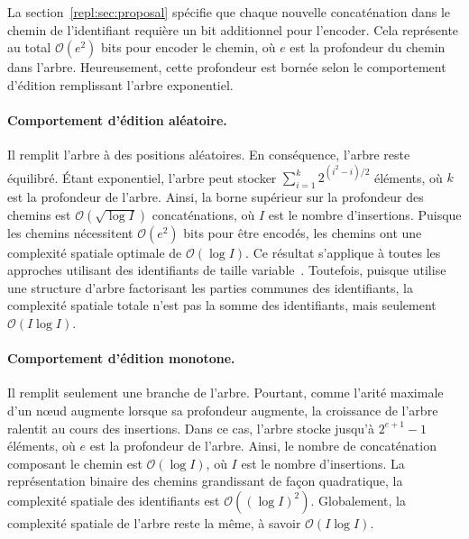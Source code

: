 La section~\ref{repl:sec:proposal} spécifie que chaque nouvelle concaténation
dans le chemin de l'identifiant requière un bit additionnel pour l'encoder. Cela
représente au total $\mathcal{O}(e^2)$ bits pour encoder le chemin, où $e$ est
la profondeur du chemin dans l'arbre. Heureusement, cette profondeur est bornée
selon le comportement d'édition remplissant l'arbre exponentiel. 


\begin{figure}
  \begin{center}
    \hspace{10pt}
    \hspace{10pt}
  \end{center}
\end{figure}


\paragraph{Comportement d'édition aléatoire. } Il remplit l'arbre à des positions
aléatoires. En conséquence, l'arbre reste équilibré. Étant exponentiel, l'arbre
peut stocker $\textstyle\sum\nolimits_{i=1}^{k}{2^{(i^2-i)/2}}$ éléments, où $k$
est la profondeur de l'arbre. Ainsi, la borne supérieur sur la profondeur des
chemins est $\mathcal{O}(\sqrt{\log I})$ concaténations, où $I$ est le nombre
d'insertions. Puisque les chemins nécessitent $\mathcal{O}(e^2)$ bits pour être
encodés, les chemins ont une complexité spatiale optimale de
$\mathcal{O}(\log I)$. Ce résultat s'applique à toutes les approches utilisant
des identifiants de taille variable~\cite{preguica2009commutative,
  weiss2009logoot}. Toutefois, puisque \LSEQ utilise une structure d'arbre
factorisant les parties communes des identifiants, la complexité spatiale totale
n'est pas la somme des identifiants, mais seulement $\mathcal{O}(I\log I)$.

\paragraph{Comportement d'édition monotone.} Il remplit seulement une branche de
l'arbre. Pourtant, comme l'arité maximale d'un nœud augmente lorsque sa
profondeur augmente, la croissance de l'arbre ralentit au cours des
insertions. Dans ce cas, l'arbre stocke jusqu'à $2^{e+1}-1$ éléments, où $e$ est
la profondeur de l'arbre. Ainsi, le nombre de concaténation composant le chemin
est $\mathcal{O}(\log I)$, où $I$ est le nombre d'insertions. La représentation
binaire des chemins grandissant de façon quadratique, la complexité spatiale des
identifiants est $\mathcal{O}((\log I)^2)$. Globalement, la complexité spatiale
de l'arbre reste la même, à savoir $\mathcal{O}(I \log I)$.

